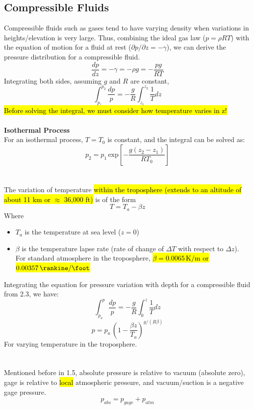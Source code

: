 ﻿\documentclass[12pt]{article}
\begin{document}
\subsection*{Compressible Fluids}
Compressible fluids such as gases tend to have varying density when variations in heights/elevation is very large. Thus, combining the ideal gas law ($p=\rho RT$) with the equation of motion for a fluid at rest ($\partial p/\partial z = -\gamma$), we can derive the pressure distribution for a compressible fluid.
\[\frac{dp}{dz} = -\gamma = -\rho g = -\frac{pg}{RT} \]
Integrating both sides, assuming $g$ and $R$ are constant,
\[\int_{p_1}^{p_2} \frac{dp}{p} = -\frac{g}{R}\int_{z_1}^{z_2} \frac{1}{T} dz\]
\hl{Before solving the integral, we must consider how temperature varies in z!}\\\\
\textbf{Isothermal Process}\\
For an isothermal process, $T=T_0$ is constant, and the integral can be solved as:
\[p_2 = p_1\, \text{exp}\left[-\frac{g(z_2-z_1)}{RT_0}\right]\]
\section*{}
The variation of temperature \hl{within the troposphere (extends to an altitude of about 11 km or $\approx$ 36,000 ft)} is of the form
\[T=T_a - \beta z\]
Where 
\begin{itemize}
    \item $T_a$ is the temperature at sea level ($z=0$)
    \item $\beta$ is the temperature lapse rate (rate of change of $\Delta T$ with respect to $\Delta z$). For standard atmosphere in the troposphere, \hl{$\beta = 0.0065\,\unit{\kelvin\per\meter}$ or $0.00357\,\unit{\rankine\per\foot}$}
\end{itemize}
Integrating the equation for pressure variation with depth for a compressible fluid from 2.3, we have:
\[\int_{p_a}^{p} \frac{dp}{p} = -\frac{g}{R}\int_{0}^{z} \frac{1}{T} dz\]
\[p = p_a\,\left(1-\frac{\beta z}{T_a}\right)^{g/(R\beta)}\]
For varying temperature in the troposphere.
\section*{}
Mentioned before in 1.5, absolute pressure is relative to vacuum (absolute zero), gage is relative to \hl{local} atmospheric pressure, and vacuum/suction is a negative gage pressure.
\[p_{abs} = p_{gage} + p_{atm}\]
\end{document}
